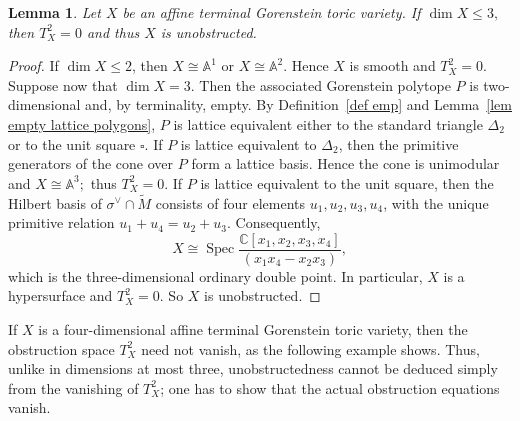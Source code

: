 \documentclass[11pt]{amsart}
\numberwithin{equation}{section}
\theoremstyle{plain}
\newtheorem{lemma}[theorem]{Lemma}
\theoremstyle{definition}
\newcommand{\0}{$0$-mutable}
\newcommand{\CC}{\ensuremath{\mathbb{C}}}
\renewcommand{\1}{$1$-rigid}
\renewcommand{\0}{$0$-mutable}
\begin{document}
\begin{lemma}\label{lem for terminal dim 3}
Let \(X\) be an affine terminal Gorenstein toric variety. If
$
\dim X\le 3,
$
then $T^2_X=0$ and thus \(X\) is unobstructed.
\end{lemma}

\begin{proof}
If \(\dim X\leq2\), then \(X\cong \mathbb A^1\) or \(X\cong \mathbb A^2\). Hence $X$ is smooth
and \(T_X^2=0\). 
{Suppose now that \(\dim X=3\). Then the associated Gorenstein polytope
\(P\) is two-dimensional and, by terminality, empty.}
By Definition~\ref{def emp} and Lemma~\ref{lem empty lattice polygons}, \(P\) is lattice equivalent either to the standard triangle \(\Delta_2\)
or to the unit square \(\square\).
{If \(P\) is lattice equivalent to \(\Delta_2\), then the primitive
generators of the cone over \(P\) form a lattice basis. Hence the cone
is unimodular and
$
X\cong\mathbb A^3; 
$
thus $T_X^2=0$.
If \(P\) is lattice equivalent to the unit square, then the Hilbert
basis of \(\sigma^\vee\cap\widetilde M\) consists of four elements
\(u_1,u_2,u_3,u_4\), with the unique primitive relation
\(u_1+u_4=u_2+u_3\). Consequently,
\[
X\cong
\operatorname{Spec}
\frac{\CC[x_1,x_2,x_3,x_4]}
     {(x_1x_4-x_2x_3)},
\]
which is the three-dimensional ordinary double point. In particular,
\(X\) is a hypersurface and \(T_X^2=0\). So
\(X\) is unobstructed.}
\end{proof}

If \(X\) is a four-dimensional affine terminal Gorenstein toric
variety, then the obstruction space \(T^2_X\) need not vanish, as the
following example shows. Thus, unlike in dimensions at most three,
unobstructedness cannot be deduced simply from the vanishing of
\(T^2_X\); one has to show that the actual obstruction equations
vanish.
\end{document}
